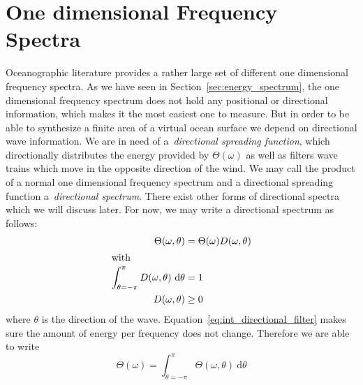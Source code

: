 \section{One dimensional Frequency Spectra}
\label{sec:1d_frequency_spectra}
Oceanographic literature provides a rather large set of different one
dimensional frequency spectra. As we have seen in
Section~\ref{sec:energy_spectrum}, the one dimensional frequency spectrum does
not hold any positional or directional information, which makes it the most
easiest one to measure. But in order to be able to synthesize a finite area of a
virtual ocean surface we depend on directional wave information. We are in need 
of a~\emph{directional spreading function}, which directionally distributes the
energy provided by $\Theta(\omega)$ as well as filters wave trains which move in
the opposite direction of the wind. We may call the product of a normal one
dimensional frequency spectrum and a directional spreading function
a~\emph{directional spectrum}. There exist other forms of directional spectra
which we will discuss later. For now, we may write a directional spectrum as
follows:
\begin{subequations}
\begin{align}
\label{eq:directional_frequency_spectrum}
 \Theta(\omega, \theta) &= \Theta(\omega)D(\omega,\theta) \\
\intertext{with}
\label{eq:int_directional_filter}
\int_{\theta=-\pi}^{\pi}D(\omega,\theta)~\mathrm{d}\theta &= 1 \\
D(\omega,\theta) &\geq 0
\end{align}
\end{subequations}
where $\theta$ is the direction of the wave.
Equation~\ref{eq:int_directional_filter} makes sure the amount of energy per
frequency does not change. Therefore we are able to write
\begin{equation}
 \Theta(\omega) = \int_{\theta=-\pi}^{\pi}\Theta(\omega,
\theta)~\mathrm{d}\theta
\end{equation}

